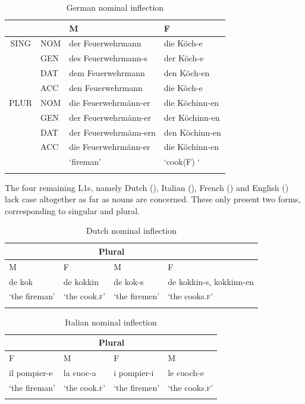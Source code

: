 \begin{table}
    \begin{tabularx}{\textwidth}{lXll}
    \lsptoprule
        \multicolumn{1}{c}{} &  & M & F\\
    \midrule
        \multicolumn{1}{c}{SING} & NOM & der Feuerwehrmann & die Köch-e\\
        & GEN & des Feuerwehrmann-s & der Köch-e\\
         & DAT & dem Feuerwehrmann & den Köch-en\\
         & ACC & den Feuerwehrmann & die Köch-e\\
        \multicolumn{1}{c}{PLUR} & NOM & die Feuerwehrmänn-er & die Köchinn-en\\
        & GEN & der Feuerwehrmänn-er & der Köchinn-en\\
         & DAT & der Feuerwehrmänn-ern & den Köchinn-en\\
         & ACC & die Feuerwehrmänn-er & die Köchinn-en\\
        \multicolumn{1}{c}{} &  & ‘fireman’ & ‘cook(F) ‘\\
\lspbottomrule
    \end{tabularx}
    \caption{German nominal inflection}
    \label{tab:02:2}
\end{table}

The four remaining L1s, namely Dutch (), Italian (), French () and English () lack case altogether as far as nouns are concerned. These only present two forms, corresponding to singular and plural.

\begin{table}
    \begin{tabularx}{\textwidth}{XX@{\hspace{1cm}}Xl}
    \lsptoprule
        \multicolumn{2}{c}{Singular} & \multicolumn{2}{c}{Plural}\\
    \midrule
        M & F & M & F\\
        de kok & de kokkin & de kok-s & de kokkin-s, kokkinn-en\\
        ‘the fireman’ & ‘the cook.\textsc{f}’ & ‘the firemen’ & ‘the cooks.\textsc{f}’\\
\lspbottomrule
    \end{tabularx}
    \caption{Dutch nominal inflection}
    \label{tab:02:3}
\end{table}

\begin{table}
    \begin{tabularx}{\textwidth}{XX@{\hspace{1cm}}Xl}
    \lsptoprule
        \multicolumn{2}{c}{Singular} & \multicolumn{2}{c}{Plural}\\
    \midrule
        F & M & F & M\\
        il pompier-e & la cuoc-a & i pompier-i & le cuoch-e \\
        ‘the fireman’ & ‘the cook.\textsc{f}’ & ‘the firemen’ & ‘the cooks.\textsc{f}’\\
\lspbottomrule
    \end{tabularx}
    \caption{Italian nominal inflection}
    \label{tab:02:4}
\end{table}

